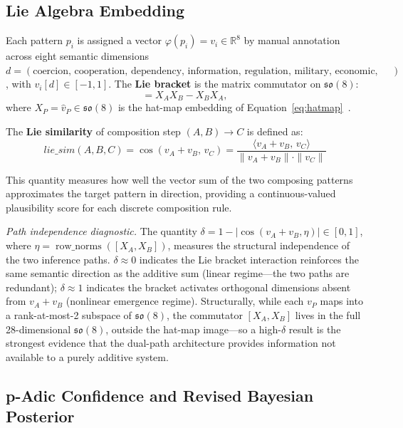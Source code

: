\documentclass{llncs}
\begin{document}
\subsection{Lie Algebra Embedding}

Each pattern $p_i$ is assigned a vector $\varphi(p_i) = v_i \in
\mathbb{R}^8$ by manual annotation across eight semantic dimensions
$d = (\text{coercion, cooperation, dependency, information, regulation,
military, economic, technology})$, with $v_i[d] \in [-1, 1]$.
The \textbf{Lie bracket} is the matrix commutator on $\mathfrak{so}(8)$:
\begin{equation}
  [X_A, X_B] = X_A X_B - X_B X_A,
  \label{eq:commutator52}
\end{equation}
where $X_P = \hat{v}_P \in \mathfrak{so}(8)$ is the hat-map embedding
of Equation~\eqref{eq:hatmap}~\cite{humphreys1972}.

The \textbf{Lie similarity} of composition step $(A, B) \to C$ is defined as:
\[
  \mathit{lie\_sim}(A, B, C)
    = \cos(v_A + v_B,\, v_C)
    = \frac{\langle v_A + v_B,\, v_C \rangle}{\|v_A + v_B\| \cdot \|v_C\|}
\]

This quantity measures how well the vector sum of the two composing
patterns approximates the target pattern in direction, providing a
continuous-valued plausibility score for each discrete composition rule.

\textit{Path independence diagnostic.} The quantity
$\delta = 1 - |\cos(v_A + v_B, \eta)| \in [0, 1]$, where
$\eta = \operatorname{row\_norms}([X_A, X_B])$, measures the structural
independence of the two inference paths. $\delta \approx 0$ indicates
the Lie bracket interaction reinforces the same semantic direction as
the additive sum (linear regime---the two paths are redundant);
$\delta \approx 1$ indicates the bracket activates orthogonal dimensions
absent from $v_A + v_B$ (nonlinear emergence regime). Structurally, while
each $v_P$ maps into a rank-at-most-2 subspace of $\mathfrak{so}(8)$, the
commutator $[X_A, X_B]$ lives in the full 28-dimensional $\mathfrak{so}(8)$,
outside the hat-map image---so a high-$\delta$ result is the strongest
evidence that the dual-path architecture provides information not available
to a purely additive system.

\subsection{p-Adic Confidence and Revised Bayesian Posterior}
\label{sec:padic}
\end{document}
